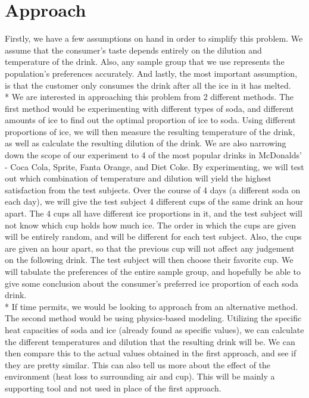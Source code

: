 \documentclass[12pt,letterpaper]{article}
\theoremstyle{definition}
\begin{document}
\section{Approach}
Firstly, we have a few assumptions on hand in order to simplify this problem. We assume that the consumer's taste depends entirely on the dilution and temperature of the drink. Also, any sample group that we use represents the population's preferences accurately. And lastly, the most important assumption, is that the customer only consumes the drink after all the ice in it has melted.
\\* We are interested in approaching this problem from 2 different methods. The first method would be experimenting with different types of soda, and different amounts of ice to find out the optimal proportion of ice to soda. Using different proportions of ice, we will then measure the resulting temperature of the drink, as well as calculate the resulting dilution of the drink. We are also narrowing down the scope of our experiment to 4 of the most popular drinks in McDonalds' - Coca Cola, Sprite, Fanta Orange, and Diet Coke. By experimenting, we will test out which combination of temperature and dilution will yield the highest satisfaction from the test subjects. Over the course of 4 days (a different soda on each day), we will give the test subject 4 different cups of the same drink an hour apart. The 4 cups all have different ice proportions in it, and the test subject will not know which cup holds how much ice. The order in which the cups are given will be entirely random, and will be different for each test subject. Also, the cups are given an hour apart, so that the previous cup will not affect any judgement on the following drink. The test subject will then choose their favorite cup. We will tabulate the preferences of the entire sample group, and hopefully be able to give some conclusion about the consumer's preferred ice proportion of each soda drink.
\\* If time permits, we would be looking to approach from an alternative method. The second method would be using physics-based modeling. Utilizing the specific heat capacities of soda and ice (already found as specific values), we can calculate the different temperatures and dilution that the resulting drink will be. We can then compare this to the actual values obtained in the first approach, and see if they are pretty similar. This can also tell us more about the effect of the environment (heat loss to surrounding air and cup). This will be mainly a supporting tool and not used in place of the first approach.
\end{document}
